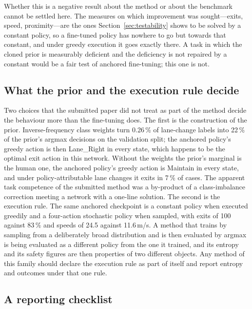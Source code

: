 Whether this is a negative result about the method or about the benchmark cannot be settled here. The measures on which improvement was sought---exits, speed, proximity---are the ones Section~\ref{sec:testability} shows to be solved by a constant policy, so a fine-tuned policy has nowhere to go but towards that constant, and under greedy execution it goes exactly there. A task in which the cloned prior is measurably deficient and the deficiency is not repaired by a constant would be a fair test of anchored fine-tuning; this one is not.

\subsection{What the prior and the execution rule decide}
\label{sec:disc_prior}

Two choices that the submitted paper did not treat as part of the method decide the behaviour more than the fine-tuning does. The first is the construction of the prior. Inverse-frequency class weights turn 0.26\,\% of lane-change labels into 22\,\% of the prior's argmax decisions on the validation split; the anchored policy's greedy action is then Lane\_Right in every state, which happens to be the optimal exit action in this network. Without the weights the prior's marginal is the human one, the anchored policy's greedy action is Maintain in every state, and under policy-attributable lane changes it exits in 7\,\% of cases. The apparent task competence of the submitted method was a by-product of a class-imbalance correction meeting a network with a one-line solution. The second is the execution rule. The same anchored checkpoint is a constant policy when executed greedily and a four-action stochastic policy when sampled, with exits of 100 against 83\,\% and speeds of 24.5 against 11.6\,m/s. A method that trains by sampling from a deliberately broad distribution and is then evaluated by argmax is being evaluated as a different policy from the one it trained, and its entropy and its safety figures are then properties of two different objects. Any method of this family should declare the execution rule as part of itself and report entropy and outcomes under that one rule.

\subsection{A reporting checklist}
\label{sec:disc_checklist}

